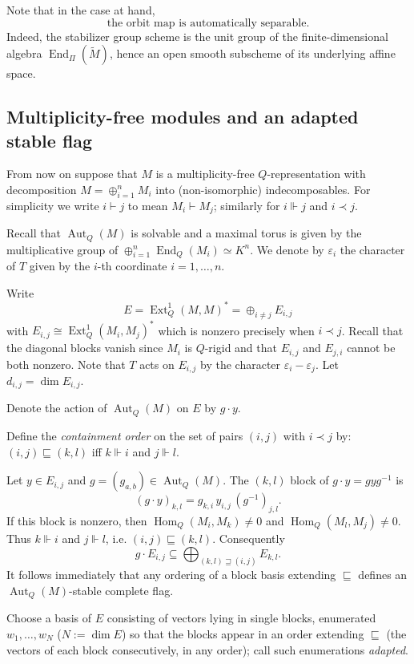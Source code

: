 \documentclass[12pt]{article}
\newcommand{\Hom}{\operatorname{Hom}}
\newcommand{\Ext}{\operatorname{Ext}}
\newcommand{\End}{\operatorname{End}}
\newcommand{\Aut}{\operatorname{Aut}}
\newcommand{\homr}{\vdash}
\newcommand{\homrt}{\Vdash}
\newcommand{\extr}{\prec}
\begin{document}
Note that in the case at hand,
\begin{equation} \label{eq: autsep}
\text{the orbit map is automatically separable.}
\end{equation}
Indeed, the stabilizer group scheme is the unit group
of the finite-dimensional algebra $\End_\Pi(\tilde M)$, hence an open smooth subscheme of its
underlying affine space.

\subsection{Multiplicity-free modules and an adapted stable flag} \label{sec: convij}

From now on suppose that $M$ is a multiplicity-free $Q$-representation with decomposition $M=\oplus_{i=1}^n M_i$ into (non-isomorphic) indecomposables.
For simplicity we write $i\homr j$ to mean $M_i\homr M_j$; similarly for $i\homrt j$ and $i\extr j$.

Recall that $\Aut_Q(M)$ is solvable and a maximal torus is given by
the multiplicative group of $\oplus_{i=1}^n\End_Q(M_i)\simeq K^n$.
We denote by $\varepsilon_i$ the character of $T$ given by the $i$-th coordinate $i=1,\dots,n$.

Write
\[
E=\Ext_Q^1(M,M)^*=\oplus_{i\neq j}E_{i,j}
\]
with $E_{i,j}\cong\Ext^1_Q(M_i,M_j)^*$ which is nonzero precisely when $i\extr j$.
Recall that the diagonal blocks vanish since $M_i$ is $Q$-rigid
and that $E_{i,j}$ and $E_{j,i}$ cannot be both nonzero.
Note that $T$ acts on $E_{i,j}$ by the character $\varepsilon_i-\varepsilon_j$.
Let $d_{i,j}=\dim E_{i,j}$.

Denote the action of $\Aut_Q(M)$ on $E$ by $g\cdot y$.


Define the \emph{containment order} on the set of pairs $(i,j)$ with $i\extr j$
by: $(i,j)\sqsubseteq(k,l)$ iff $k\homrt i$ and $j\homrt l$.


Let $y\in E_{i,j}$ and $g=(g_{a,b})\in\Aut_Q(M)$.  The $(k,l)$ block of
$g\cdot y=g y g^{-1}$ is
\[
 (g\cdot y)_{k,l}=g_{k,i}\,y_{i,j}\,(g^{-1})_{j,l}.
\]
If this block is nonzero, then $\Hom_Q(M_i,M_k)\ne0$ and
$\Hom_Q(M_l,M_j)\ne0$.  Thus $k\homrt i$ and $j\homrt l$, i.e.
$(i,j)\sqsubseteq(k,l)$.  Consequently
\[
 g\cdot E_{i,j}\subseteq \bigoplus_{(k,l)\sqsupseteq(i,j)}E_{k,l}.
\]
It follows immediately that any ordering of a block basis extending $\sqsubseteq$ defines
an $\Aut_Q(M)$-stable complete flag.


Choose a basis of $E$ consisting of vectors lying in
single blocks, enumerated $w_1,\dots,w_N$ ($N:=\dim E$) so that the
blocks appear in an order extending $\sqsubseteq$ (the vectors of
each block consecutively, in any order); call such enumerations
\emph{adapted}.
\end{document}
